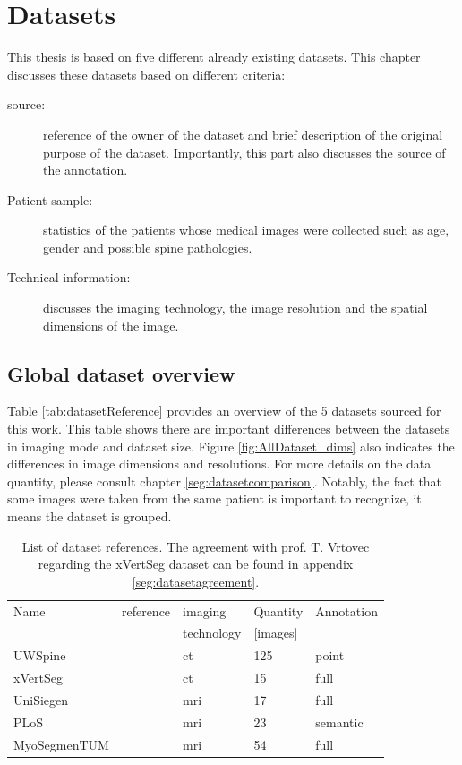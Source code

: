 \chapter{Datasets\label{sec:datasets}}

This thesis is based on five different already existing datasets.
This chapter discusses these datasets based on different criteria:

\begin{description}
    \item[source:] reference of the owner of the dataset and brief description of the original purpose of the dataset. Importantly, this part also discusses the source of the annotation.
    \item[Patient sample:] statistics of the patients whose medical images were collected such as age, gender and possible spine pathologies.
    \item[Technical information:] discusses the imaging technology, the image resolution and the spatial dimensions of the image. 
\end{description}

\section{Global dataset overview}

Table \ref{tab:datasetReference} provides an overview of the 5 datasets sourced for this work.
This table shows there are important differences between the datasets in imaging mode and dataset size.
Figure \ref{fig:AllDataset_dims} also indicates the differences in image dimensions and resolutions.
For more details on the data quantity, please consult chapter \ref{seg:datasetcomparison}. 
Notably, the fact that some images were taken from the same patient is important to recognize, 
it means the dataset is grouped. 


\begin{table}
 
    \begin{tabular}{ l l l l l} 
     \hline
     \hline
     Name & reference & imaging & Quantity & Annotation \\
          &           & technology & [images] & \\
     \hline 
    UWSpine & \cite{Glocker}  & \acrshort{ct} & 125 & point  \\ 
    xVertSeg & \cite{Ibragimov2014, Korez2015} & \acrshort{ct} & 15 & full \\
    UniSiegen  & \cite{Zukic2014} & \acrshort{mri} & 17 & full \\
    PLoS & \cite{Chu2015} & \acrshort{mri} & 23 & semantic \\
    MyoSegmenTUM & \cite{Burian2019} & \acrshort{mri} &  54 & full \\
     \hline
     \hline
    \end{tabular}
    \caption{List of dataset references. 
    The agreement with prof. T. Vrtovec regarding the xVertSeg dataset can be found in appendix \ref{seg:datasetagreement}.\label{tab:datasetReferences}}

\end{table}

